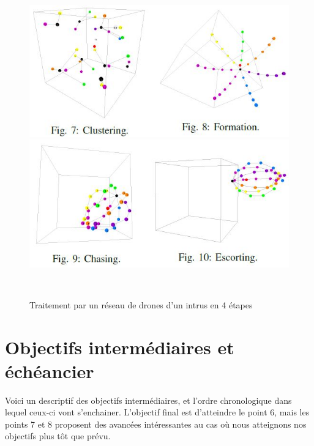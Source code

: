 \documentclass[12pt, openany]{article}
\begin{document}
\begin{figure}[!h]
    \vspace{1cm}\\
    \centering
    \includegraphics[scale = 1]{interception bulle 1.JPG}
    \includegraphics[scale = 1]{interception bulle 2.JPG}
    \caption{Traitement par un réseau de drones d'un intrus en 4 étapes}
    \vspace{1cm}\\
\end{figure}


\newpage
\section{Objectifs intermédiaires et échéancier}
\vspace{1cm}

Voici un descriptif des objectifs intermédiaires, et l'ordre chronologique dans lequel ceux-ci vont s'enchainer. L'objectif final est d'atteindre le point 6, mais les points 7 et 8 proposent des avancées intéressantes au cas où nous atteignons nos objectifs plus tôt que prévu.
\end{document}
